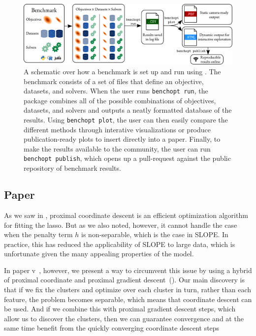 \begin{figure}[htpb]
  \centering
  \includegraphics[width=\textwidth]{figures/benchopt_schema_objectives_with_logos.pdf}
  \caption{%
    A schematic over how a benchmark is set up and run using . The benchmark consists of a set of files that define an objective, datasets, and solvers. When the user runs \texttt{benchopt run}, the package combines all of the possible combinations of objectives, datasets, and solvers and outputs a neatly formatted database of the results.
    Using \texttt{benchopt plot}, the user can then easily compare the different methods through interative visualizations or produce publication-ready plots to insert directly into a paper.
    Finally, to make the results available to the  community, the user can run \texttt{benchopt publish}, which opens up a pull-request against the public repository of benchmark results.
  }
  \label{fig:paper4-highlight}
\end{figure}

\subsection{Paper \V}

As we saw in , proximal coordinate descent is an efficient optimization algorithm for fitting the lasso. But as we also noted, however, it cannot handle the case when the penalty term \(h\) is non-separable, which is the case in SLOPE. In practice, this has reduced the applicability of SLOPE to large data, which is unfortunate given the many appealing properties of the model.

In paper v~\parencite{larsson2023}, however, we present a way to circumvent this issue by using a hybrid of proximal coordinate and proximal gradient descent~(). Our main discovery is that if we fix the clusters and optimize over each cluster in turn, rather than each feature, the problem becomes separable, which means that coordinate descent can be used. And if we combine this with proximal gradient descent steps, which allow us to discover the clusters, then we can guarantee convergence and at the same time benefit from the quickly converging coordinate descent steps

